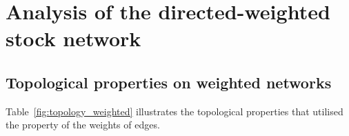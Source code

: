 \section{Analysis of the directed-weighted stock network}
\subsection{Topological properties on weighted networks}
Table~\ref{fig:topology_weighted} illustrates the topological properties that utilised the property of the weights of edges. 

